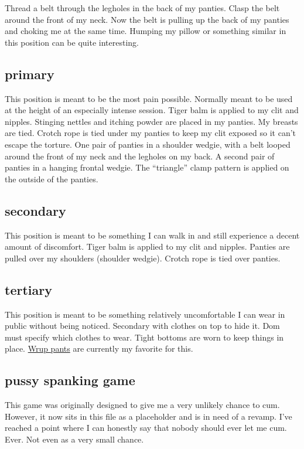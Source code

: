 \documentclass{article}
\begin{document}
Thread a belt through the legholes in the back of my panties.
Clasp the belt around the front of my neck.
Now the belt is pulling up the back of my panties and choking me at the same time.
Humping my pillow or something similar in this position can be quite interesting.

\subsection{primary}

This position is meant to be the most pain possible.
Normally meant to be used at the height of an especially intense session.
Tiger balm is applied to my clit and nipples.
Stinging nettles and itching powder are placed in my panties.
My breasts are tied.
Crotch rope is tied under my panties to keep my clit exposed so it can't escape the torture.
One pair of panties in a shoulder wedgie, with a belt looped around the front of my neck and the legholes on my back.
A second pair of panties in a hanging frontal wedgie.
The ``triangle'' clamp pattern is applied on the outside of the panties.

\subsection{secondary}

This position is meant to be something I can walk in and still experience a decent amount of discomfort.
Tiger balm is applied to my clit and nipples.
Panties are pulled over my shoulders (shoulder wedgie).
Crotch rope is tied over panties.

\subsection{tertiary}

This position is meant to be something relatively uncomfortable I can wear in public without being noticed.
Secondary with clothes on top to hide it.
Dom must specify which clothes to wear.
Tight bottoms are worn to keep things in place.
\href{https://freddystore.com/collections/freddy-wrup-pants}{Wrup pants} are currently my favorite for this.

\subsection{pussy spanking game}

This game was originally designed to give me a very unlikely chance to cum.
However, it now sits in this file as a placeholder and is in need of a revamp.
I've reached a point where I can honestly say that nobody should ever let me cum.
Ever.
Not even as a very small chance.
\end{document}
